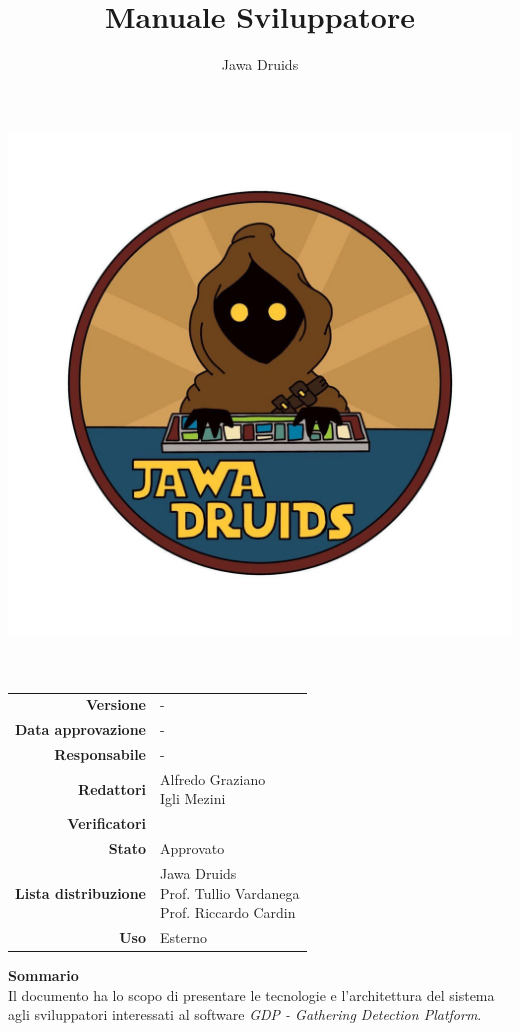 



\makeatletter
\begin{titlepage}
	\begin{center}
		\vspace*{-4cm}
		\author{Jawa Druids} 
		\title{Manuale Sviluppatore}
		\date{} %
		\includegraphics[width=0.5\linewidth]{../immagini/DRUIDSLOGO.jpg}\\[4ex]
		{\huge \bfseries  \@title }\\[2ex] 
		{\LARGE  \@author}\\[50ex]
		\vspace*{-9cm}
		\begin{table}[H]
			\renewcommand{\arraystretch}{1.4}
			\centering
			\begin{tabular}{r | l}
				\textbf{Versione} & - \\%
				\textbf{Data approvazione} & -\\
				\textbf{Responsabile} & - \\
				\textbf{Redattori} & \makecell[tl]{Alfredo Graziano \\ Igli Mezini} \\		
				\textbf{Verificatori} & \makecell[tl]{-} \\
				\textbf{Stato} & Approvato\\
				\textbf{Lista distribuzione} & \makecell[tl]{Jawa Druids \\ Prof. Tullio Vardanega \\ Prof. Riccardo Cardin}\\
				\textbf{Uso} & Esterno     
			\end{tabular}
		\end{table}
		\vspace{0.1cm}
		\hfill \break
		\fontsize{17}{10}\textbf{Sommario} \\
		\vspace{0.1cm}
		Il documento ha lo scopo di presentare le tecnologie e l'architettura del sistema agli sviluppatori interessati al software \emph{\normalsize{\textit{GDP - Gathering Detection Platform}}}.
	\end{center}
\end{titlepage}
\makeatother
	

